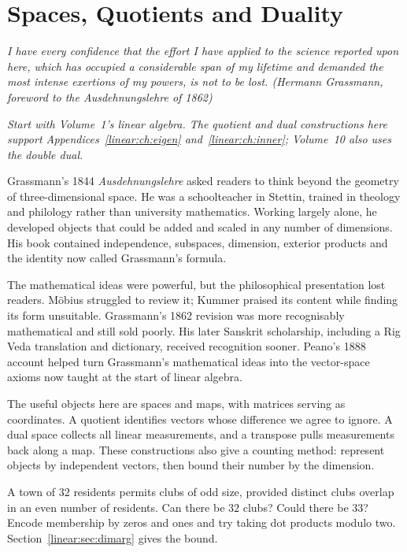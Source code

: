 \chapter{Spaces, Quotients and Duality}\label{linear:ch:duality}

\begin{center}\itshape
I have every confidence that the effort I have applied to the science reported upon here, which has occupied a
considerable span of my lifetime and demanded the most intense exertions of my powers, is not to be lost.
\upshape(Hermann Grassmann, foreword to the \emph{Ausdehnungslehre} of 1862)
\end{center}
\noindent\emph{Start with Volume~1's linear algebra. The quotient and dual constructions here support Appendices~\ref{linear:ch:eigen} and~\ref{linear:ch:inner}; Volume~10 also uses the double dual.}

Grassmann's 1844 \emph{Ausdehnungslehre} asked readers to think beyond the geometry of three-dimensional space. He was a schoolteacher in Stettin, trained in theology and philology rather than university mathematics. Working largely alone, he developed objects that could be added and scaled in any number of dimensions. His book contained independence, subspaces, dimension, exterior products and the identity now called Grassmann's formula.

The mathematical ideas were powerful, but the philosophical presentation lost readers. M\"obius struggled to review it; Kummer praised its content while finding its form unsuitable. Grassmann's 1862 revision was more recognisably mathematical and still sold poorly. His later Sanskrit scholarship, including a Rig Veda translation and dictionary, received recognition sooner. Peano's 1888 account helped turn Grassmann's mathematical ideas into the vector-space axioms now taught at the start of linear algebra.

The useful objects here are spaces and maps, with matrices serving as coordinates. A quotient identifies vectors whose difference we agree to ignore. A dual space collects all linear measurements, and a transpose pulls measurements back along a map. These constructions also give a counting method: represent objects by independent vectors, then bound their number by the dimension.

\begin{think}
A town of $32$ residents permits clubs of odd size, provided distinct clubs overlap in an even number of residents. Can there be $32$ clubs? Could there be $33$? Encode membership by zeros and ones and try taking dot products modulo two. Section~\ref{linear:sec:dimarg} gives the bound.
\end{think}

